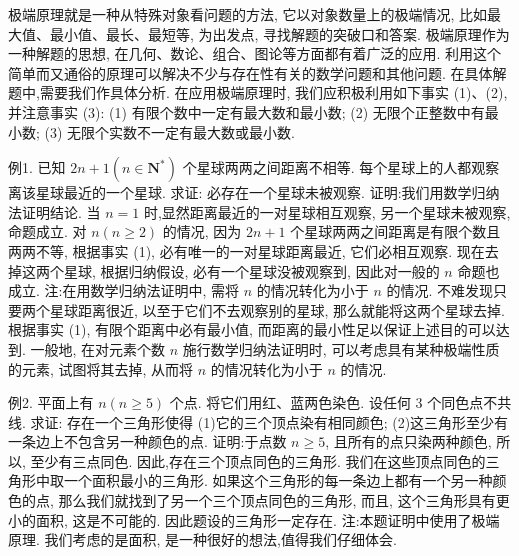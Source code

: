 
极端原理就是一种从特殊对象看问题的方法, 它以对象数量上的极端情况, 比如最大值、最小值、最长、最短等, 为出发点, 寻找解题的突破口和答案.
极端原理作为一种解题的思想, 在几何、数论、组合、图论等方面都有着广泛的应用.
利用这个简单而又通俗的原理可以解决不少与存在性有关的数学问题和其他问题.
在具体解题中,需要我们作具体分析.
在应用极端原理时, 我们应积极利用如下事实 (1)、(2), 并注意事实 (3):
(1) 有限个数中一定有最大数和最小数;
(2) 无限个正整数中有最小数;
(3) 无限个实数不一定有最大数或最小数.



例1. 已知 $2 n+1\left(n \in \mathbf{N}^*\right)$ 个星球两两之间距离不相等.
每个星球上的人都观察离该星球最近的一个星球.
求证: 必存在一个星球未被观察.
证明:我们用数学归纳法证明结论.
当 $n=1$ 时,显然距离最近的一对星球相互观察, 另一个星球未被观察, 命题成立.
对 $n(n \geqslant 2)$ 的情况, 因为 $2 n+1$ 个星球两两之间距离是有限个数且两两不等, 根据事实 (1), 必有唯一的一对星球距离最近, 它们必相互观察.
现在去掉这两个星球, 根据归纳假设, 必有一个星球没被观察到, 因此对一般的 $n$ 命题也成立.
注:在用数学归纳法证明中, 需将 $n$ 的情况转化为小于 $n$ 的情况.
不难发现只要两个星球距离很近, 以至于它们不去观察别的星球, 那么就能将这两个星球去掉.
根据事实 (1), 有限个距离中必有最小值, 而距离的最小性足以保证上述目的可以达到.
一般地, 在对元素个数 $n$ 施行数学归纳法证明时, 可以考虑具有某种极端性质的元素, 试图将其去掉, 从而将 $n$ 的情况转化为小于 $n$ 的情况.



例2. 平面上有 $n(n \geqslant 5)$ 个点.
将它们用红、蓝两色染色.
设任何 3 个同色点不共线.
求证: 存在一个三角形使得
(1)它的三个顶点染有相同颜色;
(2)这三角形至少有一条边上不包含另一种颜色的点.
证明:于点数 $n \geqslant 5$, 且所有的点只染两种颜色, 所以, 至少有三点同色.
因此,存在三个顶点同色的三角形.
我们在这些顶点同色的三角形中取一个面积最小的三角形.
如果这个三角形的每一条边上都有一个另一种颜色的点, 那么我们就找到了另一个三个顶点同色的三角形, 而且, 这个三角形具有更小的面积, 这是不可能的.
因此题设的三角形一定存在.
注:本题证明中使用了极端原理.
我们考虑的是面积, 是一种很好的想法,值得我们仔细体会.



